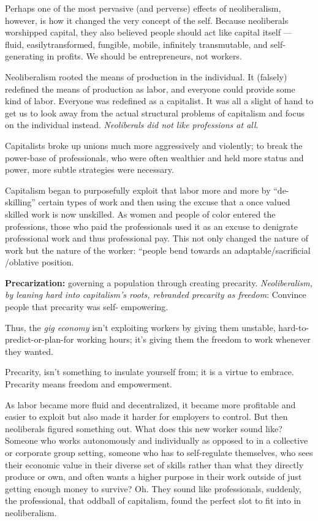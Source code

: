 \documentclass[
]{book}
\begin{document}
Perhaps one of the most pervasive (and perverse) effects of
neoliberalism, however, is how it changed the very concept of
the self. Because neoliberals worshipped capital, they also
believed people should act like capital itself --- fluid, easilytransformed, fungible, mobile, infinitely transmutable, and
self-generating in profits. We should be entrepreneurs, not
workers.

Neoliberalism rooted the
means of production in the individual. It (falsely) redefined
the means of production as labor, and everyone could provide
some kind of labor.
Everyone was redefined as a
capitalist. It was all a slight of hand to get us to look away
from the actual structural problems of capitalism and focus
on the individual instead.
\emph{Neoliberals did not like professions at all}.

Capitalists broke up unions much more aggressively and
violently; to break the power-base of professionals, who were
often wealthier and held more status and power, more subtle
strategies were necessary.

Capitalism began to
purposefully exploit that labor more and more by ``de-
skilling'' certain types of work and then using the excuse that
a once valued skilled work is now unskilled.
As women and people of color entered the professions,
those who paid the professionals used it as an excuse to
denigrate professional work and thus professional pay.
This not
only changed the nature of work but the nature of the
worker: ``people bend towards an adaptable/sacrificial
/oblative position.

\textbf{Precarization:} governing a population through creating
precarity.
\emph{Neoliberalism, by leaning hard into capitalism's roots,
rebranded precarity as freedom}:
Convince people that precarity was self-
empowering.

Thus, the \emph{gig economy} isn't exploiting workers by giving
them unstable, hard-to-predict-or-plan-for working hours; it's
giving them the freedom to work whenever they wanted.

Precarity, isn't something to insulate yourself from; it is a
virtue to embrace. Precarity means freedom and
empowerment.

As labor became more fluid and decentralized, it became
more profitable and easier to exploit but also made it harder
for employers to control.
But then neoliberals figured something out. What does this
new worker sound like? Someone who works autonomously
and individually as opposed to in a collective or corporate
group setting, someone who has to self-regulate themselves,
who sees their economic value in their diverse set of skills
rather than what they directly produce or own, and often
wants a higher purpose in their work outside of just getting
enough money to survive?
Oh.
They sound like professionals,
suddenly, the professional, that oddball of capitalism,
found the perfect slot to fit into in neoliberalism.
\end{document}
